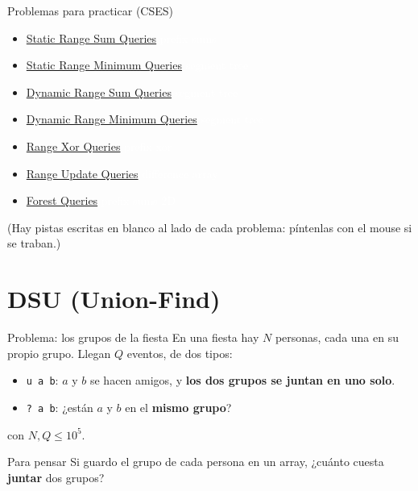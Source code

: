 \documentclass{beamer}
\begin{document}
\begin{frame}{Problemas para practicar (CSES)}
    \begin{itemize}
        \item \href{https://cses.fi/problemset/task/1646}{Static Range Sum Queries}
              \textcolor{white}{\scriptsize prefix sums}
        \item \href{https://cses.fi/problemset/task/1647}{Static Range Minimum Queries}
              \textcolor{white}{\scriptsize segment tree}
        \item \href{https://cses.fi/problemset/task/1648}{Dynamic Range Sum Queries}
              \textcolor{white}{\scriptsize segment tree}
        \item \href{https://cses.fi/problemset/task/1649}{Dynamic Range Minimum Queries}
              \textcolor{white}{\scriptsize segment tree}
        \item \href{https://cses.fi/problemset/task/1650}{Range Xor Queries}
              \textcolor{white}{\scriptsize prefix xor}
        \item \href{https://cses.fi/problemset/task/1651}{Range Update Queries}
              \textcolor{white}{\scriptsize difference array}
        \item \href{https://cses.fi/problemset/task/1652}{Forest Queries}
              \textcolor{white}{\scriptsize prefix sums 2D}
    \end{itemize}

    \vspace{0.2cm}
    \small (Hay pistas escritas en blanco al lado de cada problema:
    píntenlas con el mouse si se traban.)
\end{frame}


\section{DSU (Union-Find)}

\begin{frame}{Problema: los grupos de la fiesta}
    En una fiesta hay $N$ personas, cada una en su propio grupo. Llegan $Q$
    eventos, de dos tipos:
    \begin{itemize}
        \item \texttt{u a b}: $a$ y $b$ se hacen amigos, y \textbf{los dos
              grupos se juntan en uno solo}.
        \item \texttt{?\ a b}: ¿están $a$ y $b$ en el \textbf{mismo grupo}?
    \end{itemize}
    con $N, Q \leq 10^5$.

    \vspace{0.3cm}
    \begin{alertblock}{Para pensar}
        \centering
        Si guardo el grupo de cada persona en un array,
        ¿cuánto cuesta \textbf{juntar} dos grupos?
    \end{alertblock}
\end{frame}
\end{document}
